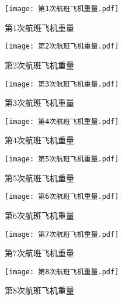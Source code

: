 \documentclass{MathorCupModeling}
\begin{document}
	\begin{figure}[H]
		\centering
		\begin{minipage}{0.48\linewidth}
			\centering
			\texttt{[image: 第1次航班飞机重量.pdf]}
			\caption{第1次航班飞机重量}
			\label{fig:第1次航班飞机重量}
		\end{minipage}
		\begin{minipage}{0.48\linewidth}
			\centering
			\texttt{[image: 第2次航班飞机重量.pdf]}
			\caption{第2次航班飞机重量}
			\label{fig:第2次航班飞机重量}
		\end{minipage}
	\end{figure}
	\begin{figure}[H]
		\centering
		\begin{minipage}{0.48\linewidth}
			\centering
			\texttt{[image: 第3次航班飞机重量.pdf]}
			\caption{第3次航班飞机重量}
			\label{fig:第3次航班飞机重量}
		\end{minipage}
		\begin{minipage}{0.48\linewidth}
			\centering
			\texttt{[image: 第4次航班飞机重量.pdf]}
			\caption{第4次航班飞机重量}
			\label{fig:第4次航班飞机重量}
		\end{minipage}
	\end{figure}
	\begin{figure}[H]
		\centering
		\begin{minipage}{0.48\linewidth}
			\centering
			\texttt{[image: 第5次航班飞机重量.pdf]}
			\caption{第5次航班飞机重量}
			\label{fig:第5次航班飞机重量}
		\end{minipage}
		\begin{minipage}{0.48\linewidth}
			\centering
			\texttt{[image: 第6次航班飞机重量.pdf]}
			\caption{第6次航班飞机重量}
			\label{fig:第6次航班飞机重量}
		\end{minipage}
	\end{figure}
	\begin{figure}[H]
		\centering
		\begin{minipage}{0.48\linewidth}
			\centering
			\texttt{[image: 第7次航班飞机重量.pdf]}
			\caption{第7次航班飞机重量}
			\label{fig:第7次航班飞机重量}
		\end{minipage}
		\begin{minipage}{0.48\linewidth}
			\centering
			\texttt{[image: 第8次航班飞机重量.pdf]}
			\caption{第8次航班飞机重量}
			\label{fig:第8次航班飞机重量}
		\end{minipage}
	\end{figure}
\end{document}
